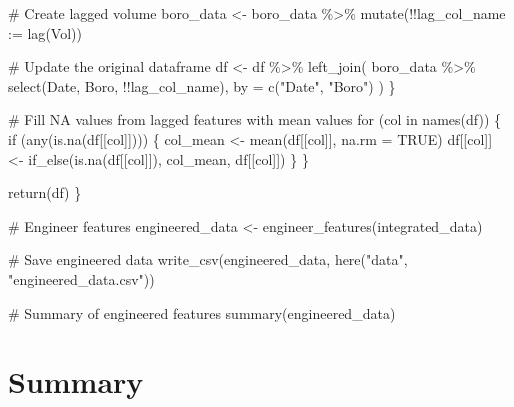 \documentclass[
  letterpaper,
  DIV=11,
  numbers=noendperiod]{scrreprt}
\newenvironment{Shaded}{\begin{snugshade}}{\end{snugshade}}
\newcommand{\AttributeTok}[1]{\textcolor[rgb]{0.40,0.45,0.13}{#1}}
\newcommand{\CommentTok}[1]{\textcolor[rgb]{0.37,0.37,0.37}{#1}}
\newcommand{\ConstantTok}[1]{\textcolor[rgb]{0.56,0.35,0.01}{#1}}
\newcommand{\ControlFlowTok}[1]{\textcolor[rgb]{0.00,0.23,0.31}{#1}}
\newcommand{\FunctionTok}[1]{\textcolor[rgb]{0.28,0.35,0.67}{#1}}
\newcommand{\NormalTok}[1]{\textcolor[rgb]{0.00,0.23,0.31}{#1}}
\newcommand{\OtherTok}[1]{\textcolor[rgb]{0.00,0.23,0.31}{#1}}
\newcommand{\SpecialCharTok}[1]{\textcolor[rgb]{0.37,0.37,0.37}{#1}}
\newcommand{\StringTok}[1]{\textcolor[rgb]{0.13,0.47,0.30}{#1}}
\begin{document}
\begin{Shaded}
\begin{Highlighting}[]
    \CommentTok{\# Create lagged volume}
\NormalTok{    boro\_data }\OtherTok{\textless{}{-}}\NormalTok{ boro\_data }\SpecialCharTok{\%\textgreater{}\%}
      \FunctionTok{mutate}\NormalTok{(}\SpecialCharTok{!!}\AttributeTok{lag\_col\_name :=} \FunctionTok{lag}\NormalTok{(Vol))}
    
    \CommentTok{\# Update the original dataframe}
\NormalTok{    df }\OtherTok{\textless{}{-}}\NormalTok{ df }\SpecialCharTok{\%\textgreater{}\%}
      \FunctionTok{left\_join}\NormalTok{(}
\NormalTok{        boro\_data }\SpecialCharTok{\%\textgreater{}\%} \FunctionTok{select}\NormalTok{(Date, Boro, }\SpecialCharTok{!!}\NormalTok{lag\_col\_name),}
        \AttributeTok{by =} \FunctionTok{c}\NormalTok{(}\StringTok{"Date"}\NormalTok{, }\StringTok{"Boro"}\NormalTok{)}
\NormalTok{      )}
\NormalTok{  \}}
  
  \CommentTok{\# Fill NA values from lagged features with mean values}
  \ControlFlowTok{for}\NormalTok{ (col }\ControlFlowTok{in} \FunctionTok{names}\NormalTok{(df)) \{}
    \ControlFlowTok{if}\NormalTok{ (}\FunctionTok{any}\NormalTok{(}\FunctionTok{is.na}\NormalTok{(df[[col]]))) \{}
\NormalTok{      col\_mean }\OtherTok{\textless{}{-}} \FunctionTok{mean}\NormalTok{(df[[col]], }\AttributeTok{na.rm =} \ConstantTok{TRUE}\NormalTok{)}
\NormalTok{      df[[col]] }\OtherTok{\textless{}{-}} \FunctionTok{if\_else}\NormalTok{(}\FunctionTok{is.na}\NormalTok{(df[[col]]), col\_mean, df[[col]])}
\NormalTok{    \}}
\NormalTok{  \}}
  
  \FunctionTok{return}\NormalTok{(df)}
\NormalTok{\}}

\CommentTok{\# Engineer features}
\NormalTok{engineered\_data }\OtherTok{\textless{}{-}} \FunctionTok{engineer\_features}\NormalTok{(integrated\_data)}

\CommentTok{\# Save engineered data}
\FunctionTok{write\_csv}\NormalTok{(engineered\_data, }\FunctionTok{here}\NormalTok{(}\StringTok{"data"}\NormalTok{, }\StringTok{"engineered\_data.csv"}\NormalTok{))}

\CommentTok{\# Summary of engineered features}
\FunctionTok{summary}\NormalTok{(engineered\_data)}
\end{Highlighting}
\end{Shaded}

\section{Summary}\label{summary}
\end{document}
